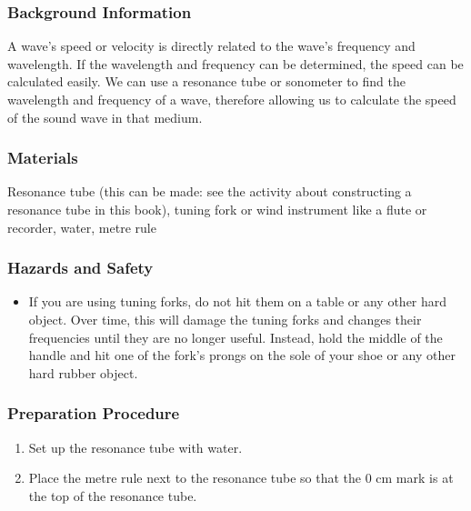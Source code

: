 \subsubsection*{Background Information}
A wave's speed or velocity is directly related to the wave's frequency and wavelength. If the wavelength and frequency can be determined, the speed can be calculated easily. We can use a resonance tube or sonometer to find the wavelength and frequency of a wave, therefore allowing us to calculate the speed of the sound wave in that medium.  

\subsubsection*{Materials}
Resonance tube (this can be made: see the activity about constructing a resonance tube in this book), tuning fork or wind instrument like a flute or recorder, water, metre rule

\subsubsection*{Hazards and Safety}
\begin{itemize}
\item{If you are using tuning forks, do not hit them on a table or any other hard object. Over time, this will damage the tuning forks and changes their frequencies until they are no longer useful. Instead, hold the middle of the handle and hit one of the fork's prongs on the sole of your shoe or any other hard rubber object.} 
\end{itemize}

\subsubsection*{Preparation Procedure}
\begin{enumerate}
\item{Set up the resonance tube with water.} 
\item{Place the metre rule next to the resonance tube so that the 0 cm mark is at the top of the resonance tube.} 
\end{enumerate}

